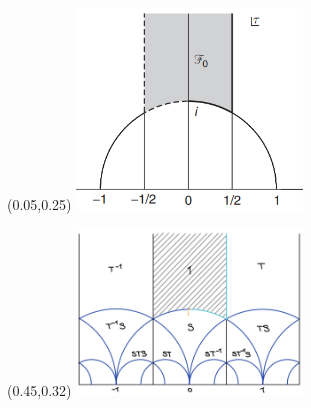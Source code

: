 \documentclass[11pt,aspectratio=169]{beamer}
\begin{document}
\begin{frame}


	\begin{textblock*}{60mm}(0.05\paperwidth,0.25\paperheight)
		{\tiny \color{accentcolor}
		\includegraphics[width=60mm]{elements/fundamental domain.PNG}\\[2mm]
		}
	\end{textblock*}
	\begin{textblock*}{60mm}(0.45\paperwidth,0.32\paperheight)
		{\tiny \color{accentcolor}
		\includegraphics[width=60mm]{elements/fundamental domain lucy.jpg}\\[2mm]
		}
	\end{textblock*}

	
\end{frame}
\end{document}

